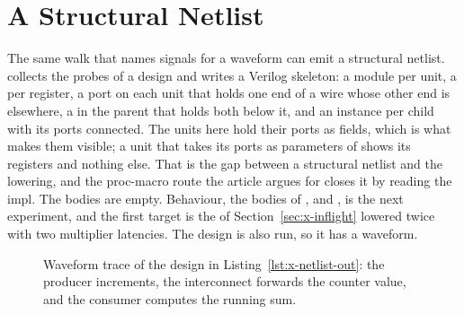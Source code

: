 \section{A Structural Netlist}
\label{sec:x-netlist}

The same walk that names signals for a waveform can emit a
structural netlist.  collects the probes of a
design and writes a Verilog skeleton: a module per unit, a 
per register, a port on each unit that holds one end of a wire whose
other end is elsewhere, a  in the parent that holds both
below it, and an instance per child with its ports connected. The
units here hold their ports as fields, which is what makes them
visible; a unit that takes its ports as parameters of  shows
its registers and nothing else. That is the gap between a structural
netlist and the lowering, and the proc-macro route the article argues
for closes it by reading the  impl. The bodies are
empty. Behaviour, the bodies of ,  and
, is the next experiment, and the first target is the
 of Section~\ref{sec:x-inflight} lowered twice with two
multiplier latencies. The design is also run, so it has a waveform.

\begin{figure}[htbp]
\centering

\caption{Waveform trace of the design in Listing~\ref{lst:x-netlist-out}: the producer increments, the interconnect forwards the counter value, and the consumer computes the running sum.}
\label{fig:x-netlist}
\end{figure}




